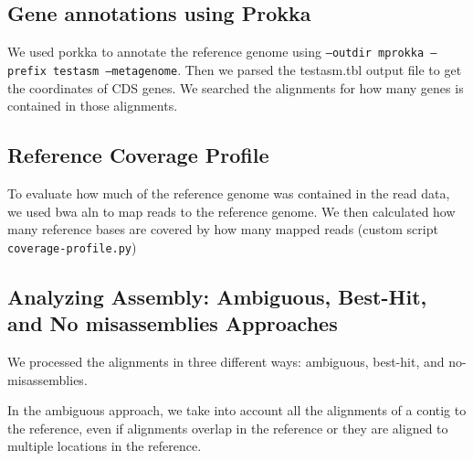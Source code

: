 \documentclass[10pt,a4paper,twocolumn]{article}
\begin{document}
\subsection*{Gene annotations using Prokka}
We used porkka \cite{prokka} to annotate the reference genome using
{\tt{--outdir mprokka --prefix testasm --metagenome}}. Then we parsed
the testasm.tbl output file to get the coordinates of CDS genes. We
searched the alignments for how many genes is contained in those
alignments.

\subsection*{Reference Coverage Profile} 

To evaluate how much of the reference genome was contained in the read
data, we used bwa aln to map reads to the reference genome.  We then
calculated how many reference bases are covered by how many mapped
reads (custom script {\tt coverage-profile.py})

\subsection*{Analyzing Assembly: Ambiguous, Best-Hit, and No misassemblies Approaches}
We processed the alignments in three different ways: ambiguous,
best-hit, and no-misassemblies.





In the ambiguous approach, we take into account all the alignments of
a contig to the reference, even if alignments overlap in the reference
or they are aligned to multiple locations in the reference.
\end{document}

